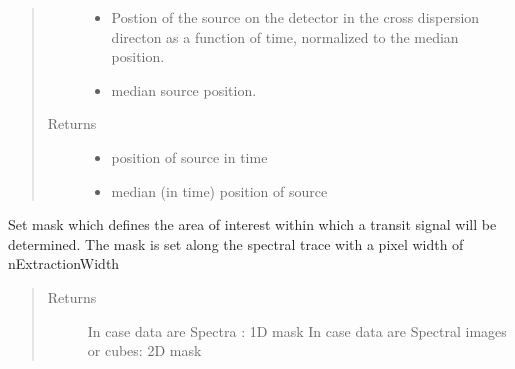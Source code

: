 \documentclass[a4paper,11pt,english]{sphinxmanual}
\begin{document}
\begin{fulllineitems}
\begin{fulllineitems}
\begin{quote}
\begin{description}
\begin{itemize}
\item {} 
 \textendash{} Postion of the source on the detector in the cross dispersion
directon as a function of time, normalized to the
median position.

\item {} 
 \textendash{} median source position.

\end{itemize}

\item[{Returns}] \leavevmode
\begin{itemize}
\item {} 
 \textendash{} position of source in time

\item {} 
 \textendash{} median (in time) position of source

\end{itemize}


\end{description}\end{quote}

\end{fulllineitems}


\begin{fulllineitems}
\label{\detokenize{cascade.TSO:cascade.TSO.TSO.TSOSuite.set_extraction_mask}}
Set mask which defines the area of interest within which
a transit signal will be determined. The mask is set along the
spectral trace with a pixel width of nExtractionWidth
\begin{quote}\begin{description}
\item[{Returns}] \leavevmode
{} \textendash{} In case data are Spectra : 1D mask
In case data are Spectral images or cubes: 2D mask

\end{description}\end{quote}

\end{fulllineitems}



\end{fulllineitems}
\end{document}
